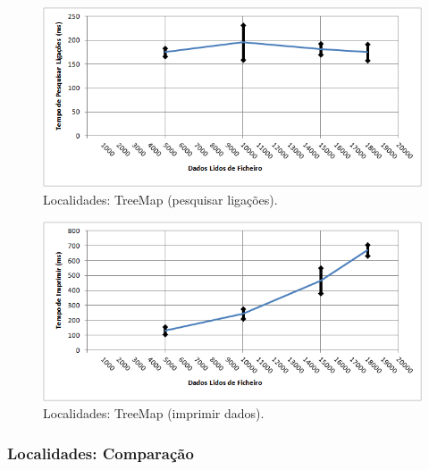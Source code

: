 \documentclass[a5paper,twocolumn, 11pt]{article}
\begin{document}
\begin{figure}[h!b!t!]
    \caption[Localidades: TreeMap (pesquisar ligações)]{Localidades: TreeMap (pesquisar ligações).}
    \label{hashtable}
    \centering
        \includegraphics[width=400pt]{cloc_conf4_o4.png}
\end{figure}
\begin{figure}[h!b!t!]
    \caption[Localidades: TreeMap (imprimir dados)]{Localidades: TreeMap (imprimir dados).}
    \label{hashtable}
    \centering
        \includegraphics[width=400pt]{cloc_conf4_o5.png}
\end{figure}




\newpage
\twocolumn
\newpage

\subsubsection[Localidades:\\Comparação]{Localidades: Comparação}
\end{document}
